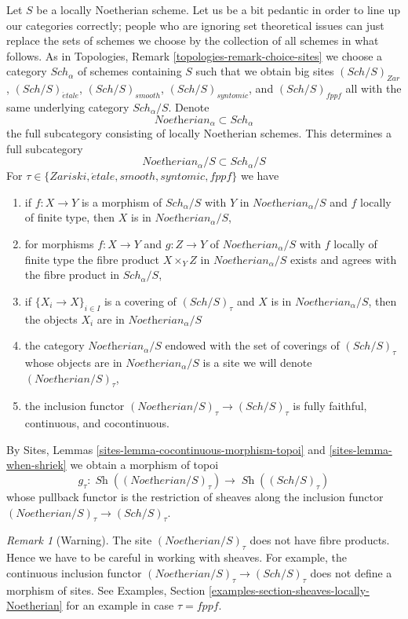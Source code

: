\documentclass{stacks-project}
\theoremstyle{plain}
\theoremstyle{definition}
\theoremstyle{remark}
\newtheorem{remark}[subsection]{Remark}
\numberwithin{equation}{subsection}
\def\Sch{\mathit{Sch}}
\def\Sh{\mathop{\mathit{Sh}}\nolimits}
\def\etale{{\acute{e}tale}}
\begin{document}
\medskip\noindent
Let $S$ be a locally Noetherian scheme. Let us be a bit pedantic in order
to line up our categories correctly; people who are ignoring set theoretical
issues can just replace the sets of schemes we choose by the collection
of all schemes in what follows. As in
Topologies, Remark \ref{topologies-remark-choice-sites}
we choose a category $\Sch_\alpha$ of schemes containing
$S$ such that we obtain big sites $(\Sch/S)_{Zar}$,
$(\Sch/S)_\etale$, $(\Sch/S)_{smooth}$, $(\Sch/S)_{syntomic}$,
and $(\Sch/S)_{fppf}$ all with the same underlying
category $\Sch_\alpha/S$. Denote
$$
\textit{Noetherian}_\alpha \subset \Sch_\alpha
$$
the full subcategory consisting of locally Noetherian schemes.
This determines a full subcategory
$$
\textit{Noetherian}_\alpha/S \subset \Sch_\alpha/S
$$
For $\tau \in \{Zariski, \etale, smooth, syntomic, fppf\}$ we have
\begin{enumerate}
\item if $f : X \to Y$ is a morphism of $\Sch_\alpha/S$
with $Y$ in $\textit{Noetherian}_\alpha/S$ and
$f$ locally of finite type, then $X$ is in $\textit{Noetherian}_\alpha/S$,
\item for morphisms $f : X \to Y$ and $g : Z \to Y$ of
$\textit{Noetherian}_\alpha/S$ with $f$ locally of finite type
the fibre product $X \times_Y Z$ in $\textit{Noetherian}_\alpha/S$
exists and agrees with the fibre product in $\Sch_\alpha/S$,
\item if $\{X_i \to X\}_{i \in I}$ is a covering of
$(\Sch/S)_\tau$ and $X$ is in $\textit{Noetherian}_\alpha/S$,
then the objects $X_i$ are in $\textit{Noetherian}_\alpha/S$
\item the category $\textit{Noetherian}_\alpha/S$ endowed
with the set of coverings of $(\Sch/S)_\tau$ whose objects
are in $\textit{Noetherian}_\alpha/S$ is a site
we will denote $(\textit{Noetherian}/S)_\tau$,
\item the inclusion functor
$(\textit{Noetherian}/S)_\tau \to (\Sch/S)_\tau$
is fully faithful, continuous, and cocontinuous.
\end{enumerate}
By Sites, Lemmas \ref{sites-lemma-cocontinuous-morphism-topoi} and
\ref{sites-lemma-when-shriek} we obtain a morphism of topoi
$$
g_\tau : \Sh((\textit{Noetherian}/S)_\tau) \longrightarrow \Sh((\Sch/S)_\tau)
$$
whose pullback functor is the restriction of sheaves along
the inclusion functor $(\textit{Noetherian}/S)_\tau \to (\Sch/S)_\tau$.

\begin{remark}[Warning]
\label{remark-no-fibre-products}
The site $(\textit{Noetherian}/S)_\tau$ does not have fibre products.
Hence we have to be careful in working with sheaves. For example,
the continuous inclusion functor
$(\textit{Noetherian}/S)_\tau \to (\Sch/S)_\tau$
does not define a morphism of sites. See
Examples, Section \ref{examples-section-sheaves-locally-Noetherian}
for an example in case $\tau = fppf$.
\end{remark}
\end{document}
